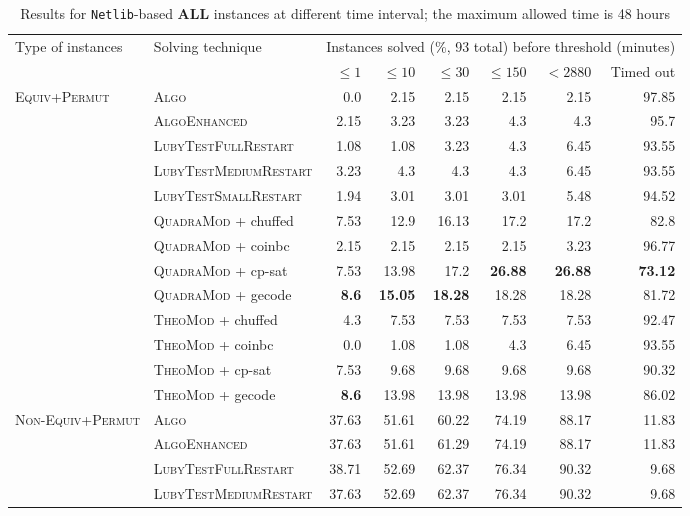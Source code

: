 \documentclass{book}
\begin{document}
\begin{table}[]\scriptsize\centering
\caption{Results for \texttt{Netlib}-based  {\bf ALL } instances at different time interval; the maximum allowed time is 48 hours}
\begin{tabular}{@{}ll rr rr rr@{}}\toprule Type of instances & Solving technique  & \multicolumn{6}{c}{Instances solved (\%, 93 total) before threshold (minutes)}\\\cmidrule(l){3-8}&  &  $\leq 1$ &  $\leq 10$ &  $\leq 30$ &  $\leq 150$ &  $ < 2880$ & Timed out\\
\midrule
\multirow{10}{*}{\textsc{Equiv+Permut}} & \textsc{Algo}   & 0.0 & 2.15 & 2.15 & 2.15 & 2.15 & 97.85 \\
& \textsc{AlgoEnhanced}   & 2.15 & 3.23 & 3.23 & 4.3 & 4.3 & 95.7 \\
& \textsc{LubyTestFullRestart}   & 1.08 & 1.08 & 3.23 & 4.3 & 6.45 & 93.55 \\
& \textsc{LubyTestMediumRestart}   & 3.23 & 4.3 & 4.3 & 4.3 & 6.45 & 93.55 \\
& \textsc{LubyTestSmallRestart}   & 1.94 & 3.01 & 3.01 & 3.01 & 5.48 & 94.52 \\
& \textsc{QuadraMod} + chuffed   & 7.53 & 12.9 & 16.13 & 17.2 & 17.2 & 82.8 \\
& \textsc{QuadraMod} + coinbc   & 2.15 & 2.15 & 2.15 & 2.15 & 3.23 & 96.77 \\
& \textsc{QuadraMod} + cp-sat   & 7.53 & 13.98 & 17.2 & \bf 26.88 & \bf 26.88 &  \bf 73.12 \\
& \textsc{QuadraMod} + gecode   & \bf 8.6 & \bf 15.05 & \bf 18.28 & 18.28 & 18.28 & 81.72 \\
& \textsc{TheoMod} + chuffed   & 4.3 & 7.53 & 7.53 & 7.53 & 7.53 & 92.47 \\
& \textsc{TheoMod} + coinbc   & 0.0 & 1.08 & 1.08 & 4.3 & 6.45 & 93.55 \\
& \textsc{TheoMod} + cp-sat   & 7.53 & 9.68 & 9.68 & 9.68 & 9.68 & 90.32 \\
& \textsc{TheoMod} + gecode   & \bf 8.6 & 13.98 & 13.98 & 13.98 & 13.98 & 86.02 \\
\midrule\multirow{10}{*}{\textsc{Non-Equiv+Permut}} & \textsc{Algo}   & 37.63 & 51.61 & 60.22 & 74.19 & 88.17 & 11.83 \\
& \textsc{AlgoEnhanced}   & 37.63 & 51.61 & 61.29 & 74.19 & 88.17 & 11.83 \\
& \textsc{LubyTestFullRestart}   & 38.71 & 52.69 & 62.37 & 76.34 & 90.32 & 9.68 \\
& \textsc{LubyTestMediumRestart}   & 37.63 & 52.69 & 62.37 & 76.34 & 90.32 & 9.68 \\

\end{tabular}
\end{table}
\end{document}
